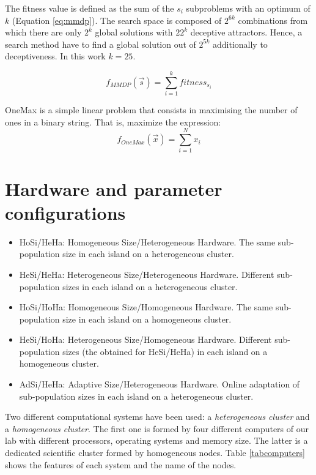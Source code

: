The fitness value is defined as the sum of the $s_i$ subproblems with an optimum of $k$ (Equation \ref{eq:mmdp}).
The search space is composed of $2^{6k}$ combinations from which there
are only $2^k$ global solutions with $22^k$ deceptive
attractors. Hence, a search method have to find a global solution
out of $2^{5k}$ additionally to deceptiveness. In this work $k=25$. 

\begin{equation}\label{eq:mmdp}
f_{MMDP}(\vec s)= \sum_{i=1}^{k} fitness_{s_i}
\end{equation}

OneMax is a simple linear problem that consists in maximising the number of ones in a binary string. That is, maximize the expression:
\begin{equation}
f_{OneMax}(\vec{x}) = \sum_{i=1}^{N}{x_{i}}
\end{equation}

\section{Hardware and parameter configurations}

\begin{itemize}
\item HoSi/HeHa: Homogeneous Size/Heterogeneous Hardware. The same sub-population size in each island on a heterogeneous cluster.
\item HeSi/HeHa: Heterogeneous Size/Heterogeneous Hardware. Different sub-population sizes in each island on a heterogeneous cluster.
\item HoSi/HoHa: Homogeneous Size/Homogeneous Hardware. The same sub-population size in each island on a homogeneous cluster.
\item HeSi/HoHa: Heterogeneous Size/Homogeneous Hardware. Different sub-population sizes (the obtained for HeSi/HeHa) in each island on a homogeneous cluster.

\item AdSi/HeHa: Adaptive Size/Heterogeneous Hardware. Online adaptation of sub-population sizes in each island on a heterogeneous cluster.
\end{itemize}

Two different computational systems have been used: a {\em heterogeneous cluster} and a {\em homogeneous cluster}. The first one is formed by four different computers of our lab with different processors, operating systems and memory size. The latter is a dedicated scientific cluster formed by homogeneous nodes. Table \ref{tabcomputers} shows the features of each system and the name of the nodes.

